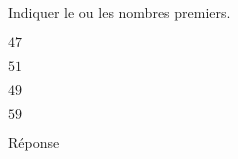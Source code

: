 \begin{exercice}
    Indiquer le ou les nombres premiers.
    \begin{ChoixQCM}{4}
        \item $47$
        \item $51$
        \item $49$
        \item $59$
    \end{ChoixQCM}
\end{exercice}
\begin{corrige}
    Réponse  
\end{corrige}